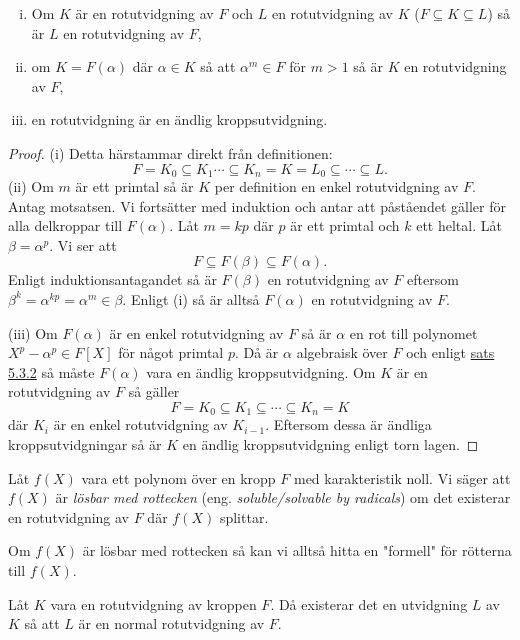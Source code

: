 \documentclass{article}
\theoremstyle{definition}
\begin{document}
\begin{mylemma}{}{}
  \begin{enumerate}[(i)]
    \item Om $K$ är en rotutvidgning av $F$ och $L$ en rotutvidgning av $K$ ($F \subseteq K \subseteq L$) så är $L$ en rotutvidgning av $F$,
    \item om $K = F(\alpha)$ där $\alpha \in K$ så att $\alpha^m \in F$ för $m > 1$ så är $K$ en rotutvidgning av $F$,
    \item en rotutvidgning är en ändlig kroppsutvidgning.
  \end{enumerate}
\end{mylemma}
\begin{proof}
  (i) Detta härstammar direkt från definitionen:
  \[F = K_0 \subseteq K_1 \cdots \subseteq K_n = K = L_0 \subseteq \cdots \subseteq L.\]
  (ii) Om $m$ är ett primtal så är $K$ per definition en enkel rotutvidgning av $F$. Antag motsatsen. 
  Vi fortsätter med induktion och antar att påståendet gäller för alla delkroppar till $F(\alpha)$. Låt $m = kp$ där $p$ är ett primtal 
  och $k$ ett heltal. Låt $\beta = \alpha^p$. Vi ser att 
  \[F \subseteq F(\beta) \subseteq F(\alpha).\]
  Enligt induktionsantagandet så är $F(\beta)$ en rotutvidgning av $F$ eftersom $\beta^k = \alpha^{kp} = \alpha^m \in \beta$. Enligt (i) så är 
  alltså $F(\alpha)$ en rotutvidgning av $F$. 
  
  (iii) Om $F(\alpha)$ är en enkel rotutvidgning av $F$ så är $\alpha$ en rot till polynomet $X^p - \alpha^p \in F[X]$ för något primtal $p$. 
  Då är $\alpha$ algebraisk över $F$ och enligt \hyperlink{5.3.2}{sats 5.3.2} så måste $F(\alpha)$ vara en ändlig kroppsutvidgning. Om 
  $K$ är en rotutvidgning av $F$ så gäller 
  \[F = K_0 \subseteq K_1 \subseteq \cdots \subseteq K_n = K\]
  där $K_i$ är en enkel rotutvidgning av $K_{i-1}$. Eftersom dessa är ändliga kroppsutvidgningar så är $K$ en ändlig kroppsutvidgning 
  enligt torn lagen. 
\end{proof}

\begin{mydef}{}{}
  Låt $f(X)$ vara ett polynom över en kropp $F$ med karakteristik noll. Vi säger att $f(X)$ är \textit{lösbar med rottecken} 
  (eng. \textit{soluble/solvable by radicals}) om det existerar 
  en rotutvidgning av $F$ där $f(X)$ splittar. 
\end{mydef}
Om $f(X)$ är lösbar med rottecken så kan vi alltså hitta en "formell" för rötterna till $f(X)$. 

\begin{mylemma}{}{}
  Låt $K$ vara en rotutvidgning av kroppen $F$. Då existerar det en utvidgning $L$ av $K$ så att $L$ är en normal rotutvidgning av $F$.
\end{mylemma}
\end{document}

